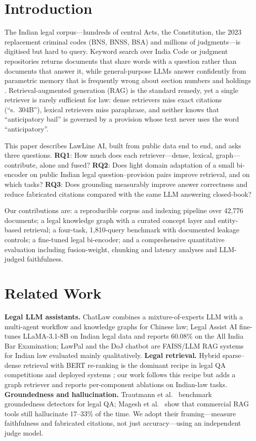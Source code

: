 \documentclass[conference]{IEEEtran}
\newcommand{\sys}{LawLine AI}
\begin{document}
\section{Introduction}
The Indian legal corpus---hundreds of central Acts, the Constitution, the 2023 replacement criminal codes (BNS, BNSS, BSA) and millions of judgments---is digitised but hard to query. Keyword search over India Code or judgment repositories returns documents that share words with a question rather than documents that answer it, while general-purpose LLMs answer confidently from parametric memory that is frequently wrong about section numbers and holdings \cite{magesh2024hallucination}. Retrieval-augmented generation (RAG) is the standard remedy, yet a single retriever is rarely sufficient for law: dense retrievers miss exact citations (``s.~304B''), lexical retrievers miss paraphrase, and neither knows that ``anticipatory bail'' is governed by a provision whose text never uses the word ``anticipatory''.

This paper describes \sys, built from public data end to end, and asks three questions. \textbf{RQ1}: How much does each retriever---dense, lexical, graph---contribute, alone and fused? \textbf{RQ2}: Does light domain adaptation of a small bi-encoder on public Indian legal question--provision pairs improve retrieval, and on which tasks? \textbf{RQ3}: Does grounding measurably improve answer correctness and reduce fabricated citations compared with the same LLM answering closed-book?

Our contributions are: a reproducible corpus and indexing pipeline over 42,776 documents; a legal knowledge graph with a curated concept layer and entity-based retrieval; a four-task, 1,810-query benchmark with documented leakage controls; a fine-tuned legal bi-encoder; and a comprehensive quantitative evaluation including fusion-weight, chunking and latency analyses and LLM-judged faithfulness.

\section{Related Work}
\textbf{Legal LLM assistants.} ChatLaw \cite{cui2024chatlaw} combines a mixture-of-experts LLM with a multi-agent workflow and knowledge graphs for Chinese law; Legal Assist AI \cite{gupta2024legalassist} fine-tunes LLaMA-3.1-8B on Indian legal data and reports 60.08\% on the All India Bar Examination; LawPal \cite{panchal2025lawpal} and the DoJ chatbot \cite{surya2025doj} are FAISS/LLM RAG systems for Indian law evaluated mainly qualitatively.
\textbf{Legal retrieval.} Hybrid sparse--dense retrieval with BERT re-ranking is the dominant recipe in legal QA competitions \cite{van2022alqac} and deployed systems \cite{khazaeli2021freeformat}; our work follows this recipe but adds a graph retriever and reports per-component ablations on Indian-law tasks.
\textbf{Groundedness and hallucination.} Trautmann et al.\ \cite{trautmann2024groundedness} benchmark groundedness detectors for legal QA; Magesh et al.\ \cite{magesh2024hallucination} show that commercial RAG tools still hallucinate 17--33\% of the time. We adopt their framing---measure faithfulness and fabricated citations, not just accuracy---using an independent judge model.
\end{document}

